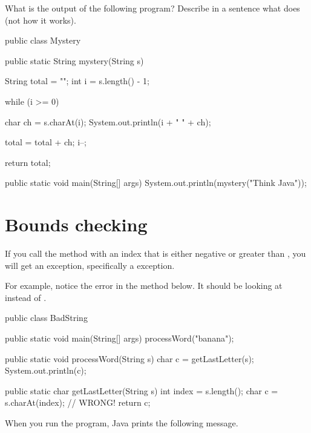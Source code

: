 \begin{exercise}

What is the output of the following program?
Describe in a sentence what  does (not how it works).

\begin{code}
public class Mystery {

    public static String mystery(String s) {
        String total = "";
        int i = s.length() - 1;

        while (i >= 0) {
            char ch = s.charAt(i);
            System.out.println(i + "     " + ch);

            total = total + ch;
            i--;
        }
        return total;
    }

    public static void main(String[] args) {
        System.out.println(mystery("Think Java"));
    }

}
\end{code}

\end{exercise}


\section{Bounds checking}
\label{StringIndexOutOfBounds}


If you call the  method with an index that is either negative or greater than , you will get an exception, specifically a  exception.

For example, notice the error in the  method below.
It should be looking at  instead of .

\begin{code}
public class BadString {
    public static void main(String[] args) {
        processWord("banana");
    }

    public static void processWord(String s) {
        char c = getLastLetter(s);
        System.out.println(c);
    }

    public static char getLastLetter(String s) {
        int index = s.length();
        char c = s.charAt(index);  // WRONG!
        return c;
    }
}
\end{code}

When you run the  program, Java prints the following message.

